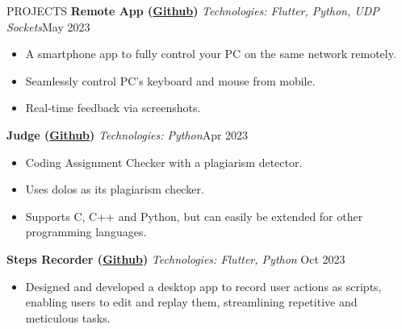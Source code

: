 \documentclass{resume}
\begin{document}
\begin{rSection}{PROJECTS}
    \textbf{Remote App (\href{https://github.com/ShivanshuKGupta/remote}{Github})} \textit{Technologies: Flutter, Python, UDP Sockets}\hfill May 2023
    \begin{itemize}
        \itemsep -3pt {}
        \item A smartphone app to fully control your PC on the same network remotely.
        \item Seamlessly control PC's keyboard and mouse from mobile.
        \item Real-time feedback via screenshots.
    \end{itemize}

    \textbf{Judge (\href{https://github.com/ShivanshuKGupta/Judge}{Github})} \textit{Technologies: Python}\hfill Apr 2023
    \begin{itemize}
        \itemsep -3pt {}
        \item Coding Assignment Checker with a plagiarism detector.
        \item Uses dolos as its plagiarism checker.
        \item Supports C, C++ and Python, but can easily be extended for other programming languages.

    \end{itemize}

    \textbf{Steps Recorder (\href{https://github.com/ShivanshuKGupta/Steps-Recorder}{Github})} \textit{Technologies: Flutter, Python} \hfill Oct 2023
    \begin{itemize}
        \itemsep -3pt {}
        \item Designed and developed a desktop app to record user actions as scripts, enabling users to edit and replay them, streamlining repetitive and meticulous tasks.
    \end{itemize}



\end{rSection}
\end{document}
